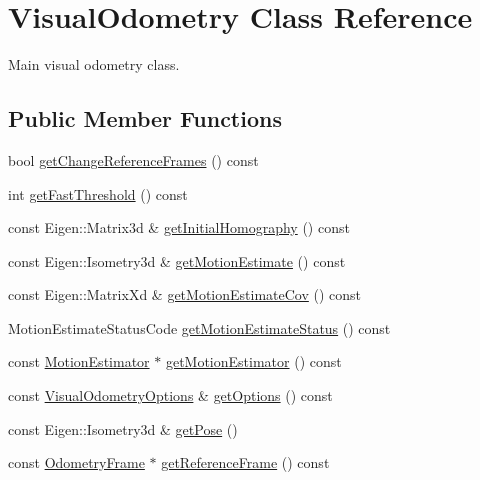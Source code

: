 \hypertarget{classfovis_1_1VisualOdometry}{
\section{VisualOdometry Class Reference}
\label{classfovis_1_1VisualOdometry}
}


Main visual odometry class.  


\subsection*{Public Member Functions}
\begin{DoxyCompactItemize}
\item 
bool \hyperlink{classfovis_1_1VisualOdometry_acbe563757a45cb680db2b6b01f2c1619}{getChangeReferenceFrames} () const 
\item 
int \hyperlink{classfovis_1_1VisualOdometry_aeadd11b0fc7b95fc374f9f4c441cb19b}{getFastThreshold} () const 
\item 
const Eigen::Matrix3d \& \hyperlink{classfovis_1_1VisualOdometry_a06475550bc622f54d1e1152bf48af59d}{getInitialHomography} () const 
\item 
const Eigen::Isometry3d \& \hyperlink{classfovis_1_1VisualOdometry_a7c8a153a489f90c60123666495900a72}{getMotionEstimate} () const 
\item 
const Eigen::MatrixXd \& \hyperlink{classfovis_1_1VisualOdometry_a13c92fba48648f413eebccd6fde24e18}{getMotionEstimateCov} () const 
\item 
MotionEstimateStatusCode \hyperlink{classfovis_1_1VisualOdometry_ae03356861ab491be0d5e608c8cdd33a2}{getMotionEstimateStatus} () const 
\item 
const \hyperlink{classfovis_1_1MotionEstimator}{MotionEstimator} $\ast$ \hyperlink{classfovis_1_1VisualOdometry_a46ee2db8b83c7d29d2788284a20118a5}{getMotionEstimator} () const 
\item 
const \hyperlink{group__FovisCore_ga113578b67d3e37bc78f1fffd8440e1ff}{VisualOdometryOptions} \& \hyperlink{classfovis_1_1VisualOdometry_a1d3dff2d7747af2023d37b9fc083839d}{getOptions} () const 
\item 
const Eigen::Isometry3d \& \hyperlink{classfovis_1_1VisualOdometry_a6e5d8524487f34d5f3c5dc8e26328f81}{getPose} ()
\item 
const \hyperlink{classfovis_1_1OdometryFrame}{OdometryFrame} $\ast$ \hyperlink{classfovis_1_1VisualOdometry_a6700c99d0ce2f67bb76ba55098f0e814}{getReferenceFrame} () const 
\item 

\end{DoxyCompactItemize}
